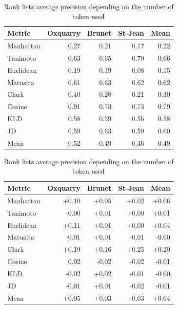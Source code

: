 \begin{table}
  \centering
  \caption{Rank lists average precision depending on the number of token used}

  \label{tab:baseline_every_token}
  \begin{tabular}{l r r r|r}
    \toprule
    Metric & Oxquarry & Brunet & St-Jean & Mean \\
    \midrule
    Manhattan & 0.27 & 0.21 & 0.17 & 0.22 \\
    Tanimoto  & 0.63 & 0.65 & 0.70 & 0.66 \\
    Euclidean & 0.19 & 0.19 & 0.08 & 0.15 \\
    Matusita  & 0.61 & 0.63 & 0.62 & 0.62 \\
    Clark     & 0.40 & 0.28 & 0.21 & 0.30 \\
    Cosine    & 0.91 & 0.73 & 0.73 & 0.79 \\
    KLD       & 0.58 & 0.59 & 0.56 & 0.58 \\
    JD        & 0.59 & 0.63 & 0.59 & 0.60 \\
    \midrule
    Mean      & 0.52 & 0.49 & 0.46 & 0.49 \\
    \bottomrule
  \end{tabular}

  \vspace{0.5cm}

  \label{tab:gain_without_hapax_legomena}
  \begin{tabular}{l r r r|r}
    \toprule
    Metric & Oxquarry & Brunet & St-Jean & Mean \\
    \midrule
    Manhattan & +0.10 & +0.05 & +0.02 & +0.06 \\
    Tanimoto  & -0.00 & +0.01 & +0.00 & +0.01 \\
    Euclidean & +0.11 & +0.01 & +0.00 & +0.04 \\
    Matusita  & -0.01 & +0.01 & -0.01 & -0.00 \\
    Clark     & +0.19 & +0.16 & +0.25 & +0.20 \\
    Cosine    &  0.02 & -0.02 & -0.02 & -0.01 \\
    KLD       & -0.02 & +0.02 & -0.01 & -0.00 \\
    JD        & -0.01 & +0.01 & -0.02 & -0.01 \\
    \midrule
    Mean      & +0.05 & +0.03 & +0.03 & +0.04 \\
    \bottomrule
  \end{tabular}


\end{table}
